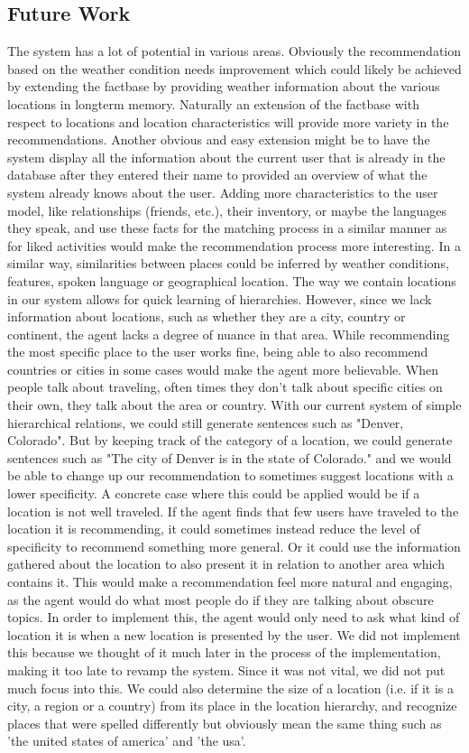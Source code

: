 \documentclass[11pt]{article} %
\begin{document}
\subsection{Future Work}
The system has a lot of potential in various areas. 
Obviously the recommendation based on the weather condition needs improvement which could likely be achieved by extending the factbase by providing weather information about the various locations in longterm memory.
Naturally an extension of the factbase with respect to locations and location characteristics will provide more variety in the recommendations.
Another obvious and easy extension might be to have the system display all the information about the current user that is already in the database after they entered their name to provided an overview of what the system already knows about the user. 
Adding more characteristics to the user model, like relationships (friends, etc.), their inventory, or maybe the languages they speak, and use these facts for the matching process in a similar manner as for liked activities would make the recommendation process more interesting.
In a similar way, similarities between places could be inferred by weather conditions, features, spoken language or geographical location.
The way we contain locations in our system allows for quick learning of hierarchies. However, since we lack information about locations, such as whether they are a city, country or continent, the agent lacks a degree of nuance in that area.
While recommending the most specific place to the user works fine, being able to also recommend countries or cities in some cases would make the agent more believable. When people talk about traveling, 
often times they don't talk about specific cities on their own, they talk about the area or country. With our current system of simple hierarchical relations, we could still generate sentences such as "Denver, Colorado". 
But by keeping track of the category of a location, we could generate sentences such as "The city of Denver is in the state of Colorado." and we would be able to change up our recommendation to sometimes suggest locations 
with a lower specificity. A concrete case where this could be applied would be if a location is not well traveled. If the agent finds that few users have traveled to the location it is recommending, it could sometimes instead 
reduce the level of specificity to recommend something more general. Or it could use the information gathered about the location to also present it in relation to another area which contains it. This would make 
a recommendation feel more natural and engaging, as the agent would do what most people do if they are talking about obscure topics. In order to implement this, the agent would only need to ask what kind of location it is when a new location is presented by the user.
We did not implement this because we thought of it much later in the process of the implementation, making it too late to revamp the system. Since it was not vital, we did not put much focus into this.
We could also determine the size of a location (i.e. if it is a city, a region or a country) from its place in the location hierarchy, and recognize places that were spelled differently but obviously mean the same thing such as 'the united states of america' and 'the usa'.
\end{document}
